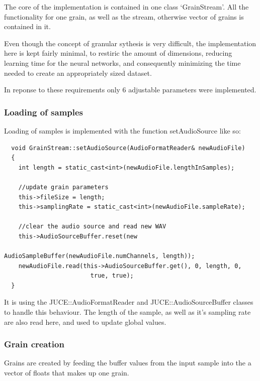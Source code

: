 The core of the implementation is contained in one class
`GrainStream'. All the functionality for one grain, as well as the
stream, otherwise vector of grains is contained in it.

Even though the concept of granular sythesis is very difficult, the
implementation here is kept fairly minimal, to restiric the amount of
dimensions, reducing learning time for the neural networks, and
consequently minimizing the time needed to create an appropriately
sized dataset.

In reponse to these requirements only 6 adjustable parameters were
implemented.

\subsubsection{Loading of samples}

Loading of samples is implemented with the function setAudioSource
like so:
\begin{lstlisting}
  void GrainStream::setAudioSource(AudioFormatReader& newAudioFile)
  {
    int length = static_cast<int>(newAudioFile.lengthInSamples);

    //update grain parameters
    this->fileSize = length;
    this->samplingRate = static_cast<int>(newAudioFile.sampleRate);

    //clear the audio source and read new WAV
    this->AudioSourceBuffer.reset(new
                                     AudioSampleBuffer(newAudioFile.numChannels, length));
    newAudioFile.read(this->AudioSourceBuffer.get(), 0, length, 0,
                        true, true);
  }
\end{lstlisting}

It is using the JUCE::AudioFormatReader and JUCE::AudioSourceBuffer
classes to handle this behaviour. The length of the sample, as well as
it's sampling rate are also read here, and used to update global
values. 

\subsubsection{Grain creation}

Grains are created by feeding the buffer values
from the input sample into the a vector of floats that makes up one
grain.

